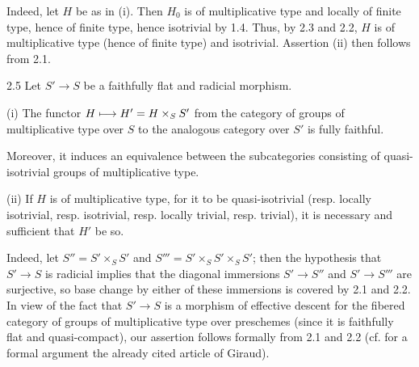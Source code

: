 Indeed, let $H$ be as in (i). Then $H_0$ is of multiplicative type and locally of finite type, hence of finite type, hence isotrivial by 1.4. Thus, by 2.3 and 2.2, $H$ is of multiplicative type (hence of finite type) and isotrivial. Assertion (ii) then follows from 2.1.
\begin{corollary}{2.5}\label{X.2.5}
Let $S'\to S$ be a faithfully flat and radicial morphism.

(i) The functor $H\longmapsto H'=H\times_S S'$ from the category of groups of multiplicative type over $S$ to the analogous category over $S'$ is fully faithful.

Moreover, it induces an equivalence between the subcategories consisting of quasi-isotrivial groups of multiplicative type.

(ii) If $H$ is of multiplicative type, for it to be quasi-isotrivial (resp. locally isotrivial, resp. isotrivial, resp. locally trivial, resp. trivial), it is necessary and sufficient that $H'$ be so.
\end{corollary}
Indeed, let $S''=S'\times_S S'$ and $S'''=S'\times_S S'\times_S S'$; then the hypothesis that $S'\to S$ is radicial implies that the diagonal immersions $S'\to S''$ and $S'\to S'''$ are surjective, so base change by either of these immersions is covered by 2.1 and 2.2. In view of the fact that $S'\to S$ is a morphism of effective descent for the fibered category of groups of multiplicative type over preschemes (since it is faithfully flat and quasi-compact), our assertion follows formally from 2.1 and 2.2 (cf. for a formal argument the already cited article of Giraud).

